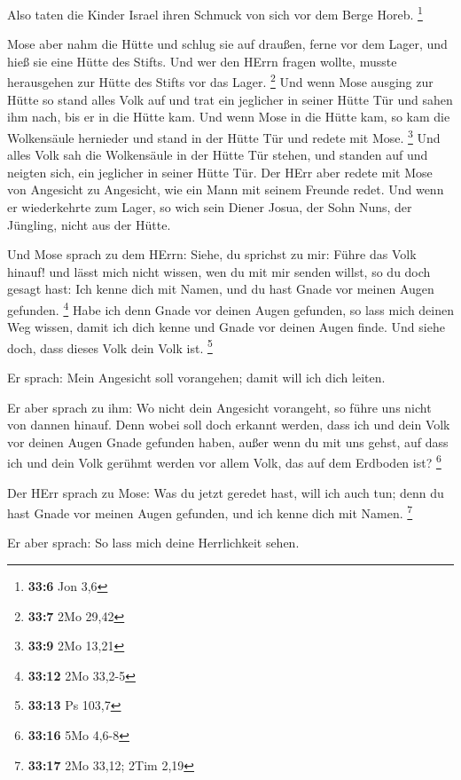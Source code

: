  Also taten die Kinder Israel ihren Schmuck von sich vor dem
Berge Horeb. \footnote{\textbf{33:6} Jon 3,6}

 Mose aber nahm die Hütte und schlug sie auf draußen, ferne
vor dem Lager, und hieß sie eine Hütte des Stifts. Und wer den HErrn
fragen wollte, musste herausgehen zur Hütte des Stifts vor das Lager.
\footnote{\textbf{33:7} 2Mo 29,42}  Und wenn Mose ausging
zur Hütte so stand alles Volk auf und trat ein jeglicher in seiner Hütte
Tür und sahen ihm nach, bis er in die Hütte kam.  Und wenn
Mose in die Hütte kam, so kam die Wolkensäule hernieder und stand in der
Hütte Tür und redete mit Mose. \footnote{\textbf{33:9} 2Mo 13,21}
 Und alles Volk sah die Wolkensäule in der Hütte Tür
stehen, und standen auf und neigten sich, ein jeglicher in seiner Hütte
Tür.  Der HErr aber redete mit Mose von Angesicht zu
Angesicht, wie ein Mann mit seinem Freunde redet. Und wenn er
wiederkehrte zum Lager, so wich sein Diener Josua, der Sohn Nuns, der
Jüngling, nicht aus der Hütte.

 Und Mose sprach zu dem HErrn: Siehe, du sprichst zu mir:
Führe das Volk hinauf! und lässt mich nicht wissen, wen du mit mir
senden willst, so du doch gesagt hast: Ich kenne dich mit Namen, und du
hast Gnade vor meinen Augen gefunden. \footnote{\textbf{33:12} 2Mo
  33,2-5}  Habe ich denn Gnade vor deinen Augen gefunden,
so lass mich deinen Weg wissen, damit ich dich kenne und Gnade vor
deinen Augen finde. Und siehe doch, dass dieses Volk dein Volk ist.
\footnote{\textbf{33:13} Ps 103,7}

 Er sprach: Mein Angesicht soll vorangehen; damit will ich
dich leiten.

 Er aber sprach zu ihm: Wo nicht dein Angesicht vorangeht,
so führe uns nicht von dannen hinauf.  Denn wobei soll doch
erkannt werden, dass ich und dein Volk vor deinen Augen Gnade gefunden
haben, außer wenn du mit uns gehst, auf dass ich und dein Volk gerühmt
werden vor allem Volk, das auf dem Erdboden ist? \footnote{\textbf{33:16}
  5Mo 4,6-8}

 Der HErr sprach zu Mose: Was du jetzt geredet hast, will
ich auch tun; denn du hast Gnade vor meinen Augen gefunden, und ich
kenne dich mit Namen. \footnote{\textbf{33:17} 2Mo 33,12; 2Tim 2,19}

 Er aber sprach: So lass mich deine Herrlichkeit sehen.

